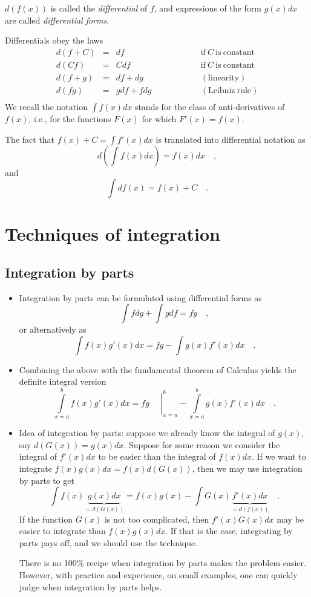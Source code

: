 \documentclass[12pt]{book}
\newcommand{\importantFormula}[1]{\begin{equation} \boxed{#1} \end{equation}}
\begin{document}
$d(f(x))$ is called the \emph{differential} of $f$, and expressions of the form $g(x)dx$ are called \emph{differential forms}.

Differentials obey the laws
\[
\begin{array}{rcll}
d(f+C)&=&df \quad \quad &\mathrm{if~} C \mathrm{~is~constant}\\
d(Cf)&=&Cdf \quad \quad &\mathrm{if~} C \mathrm{~is~constant}\\
d(f+g)&=&df+dg \quad\quad\quad\quad \quad &(\mathrm{linearity})\\
d(fg)&=&gdf+fdg \quad\quad\quad\quad \quad &(\mathrm{Leibniz~rule})\\
\end{array}
\]
We recall the notation $\int f(x)dx$ stands for the class of anti-derivatives of $f(x)$, i.e., for the functions $F(x)$ for which $F'(x) = f(x)$.

The fact that $f(x)+C=\int f'(x)dx$ is translated into differential notation as 
\importantFormula{
d \left(\int f(x)dx\right)= f(x)dx\quad ,
}
and
\importantFormula{
\int df(x)= f(x)+C\quad .
}
\section{Techniques of integration}
\subsection{Integration by parts}
\begin{itemize}
\item Integration by parts can be formulated using differential forms as
\importantFormula{
\int f dg+ \int g df = fg\quad, 
}
or alternatively as
\importantFormula{
\int f(x) g'(x)dx = fg- \int g(x) f'(x)dx \quad .
}
\item  Combining the above with the fundamental theorem of Calculus yields the definite integral version
\importantFormula{
\int\limits_{x=a}^{b} f(x) g'(x)dx = \left.fg\phantom\int\right|_{x=a}^b - \int\limits_{x=a}^b g(x) f'(x)dx \quad.
}
\item Idea of integration by parts: suppose we already know the integral of $g(x)$, say $d(G(x))=g(x)dx$. Suppose for some reason we consider the integral of $f'(x)dx$ to be easier than the integral of $f(x)dx$. If we want to integrate $f(x)g(x)dx= f(x)d(G(x))$, then we may use integration by parts to get
\[
\int f(x)\underbrace{g(x)dx}_{=d(G(x))}= f(x)g(x)- \int G(x) \underbrace{f'(x)dx}_{=d(f(x))}\quad .
\]
If the function $G(x)$ is not too complicated, then $f'(x)G(x)dx$ may be easier to integrate than $f(x)g(x)dx$. If that is the case, integrating by parts pays off, and we should use the technique. 

There is no 100\% recipe when integration by parts makes the problem easier. However, with practice and experience, on small examples, one can quickly judge when integration by parts helps.
\end{itemize}
\end{document}
